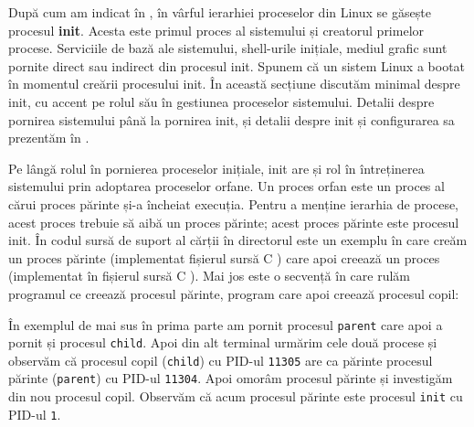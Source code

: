 După cum am indicat în ,
în vârful ierarhiei proceselor din Linux se găsește procesul \textbf{init}. Acesta este
primul proces al sistemului și creatorul primelor procese. Serviciile de bază
ale sistemului, shell-urile inițiale, mediul grafic sunt pornite direct sau
indirect din procesul init. Spunem că un sistem Linux a bootat în momentul
creării procesului init. În această secțiune discutăm minimal despre init, cu
accent pe rolul său în gestiunea proceselor sistemului. Detalii despre pornirea
sistemului până la pornirea init, și detalii despre init și configurarea sa
prezentăm în .

Pe lângă rolul în pornierea proceselor inițiale, init are și rol în întreținerea
sistemului prin adoptarea proceselor orfane. Un proces orfan este un proces al
cărui proces părinte și-a încheiat execuția. Pentru a menține ierarhia de
procese, acest proces trebuie să aibă un proces părinte; acest proces părinte
este procesul init. În codul sursă de suport al cărții în directorul  este un exemplu în care creăm un proces părinte (implementat fișierul sursă C ) care apoi creează un proces (implementat în fișierul sursă C ). Mai jos este o secvență în care rulăm programul ce creează procesul părinte, program care apoi creează procesul copil:

În exemplul de mai sus în prima parte am pornit procesul \texttt{parent} care apoi a pornit și procesul \texttt{child}. Apoi din alt terminal urmărim cele două procese și observăm că procesul copil (\texttt{child}) cu PID-ul \texttt{11305} are ca părinte procesul părinte (\texttt{parent}) cu PID-ul \texttt{11304}. Apoi omorâm procesul părinte și investigăm din nou procesul copil. Observăm că acum procesul părinte este procesul \texttt{init} cu PID-ul \texttt{1}.

